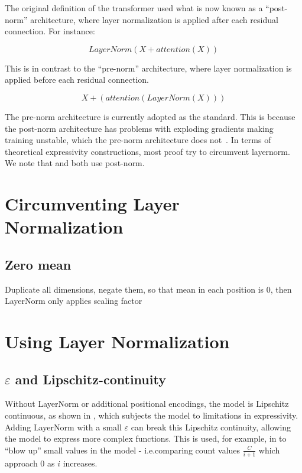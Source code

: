 The original definition of the transformer used what is now known as a ``post-norm'' architecture, where layer normalization is applied after each residual connection. For instance:

\[LayerNorm(X+attention(X))\]

This is in contrast to the ``pre-norm'' architecture, where layer normalization is applied before each residual connection.

\[X+(attention(LayerNorm(X)))\]

The pre-norm architecture is currently adopted as the standard. This is because the post-norm architecture has problems with exploding gradients making training unstable, which the pre-norm architecture does not~\citep{xiong2020layer}. In terms of theoretical expressivity constructions, most proof try to circumvent layernorm. We note that \citet{hahn-rofin-2024-sensitive} and \citet{yang2024counting} both use post-norm.



\section{Circumventing Layer Normalization}

\subsection{Zero mean}

Duplicate all dimensions, negate them, so that mean in each position is $0$, then LayerNorm only applies scaling factor


\section{Using Layer Normalization}

\subsection{$\varepsilon$ and Lipschitz-continuity}

Without LayerNorm or additional positional encodings, the model is Lipschitz continuous, as shown in \citet{hahn-2020-theoretical}, which subjects the model to limitations in expressivity. Adding LayerNorm with a small $\varepsilon$ can break this Lipschitz continuity, allowing the model to express more complex functions. This is used, for example, in \citet{yang2024counting} to ``blow up'' small values in the model - i.e.comparing count values $\frac{C}{i+1}$ which approach $0$ as $i$ increases.

